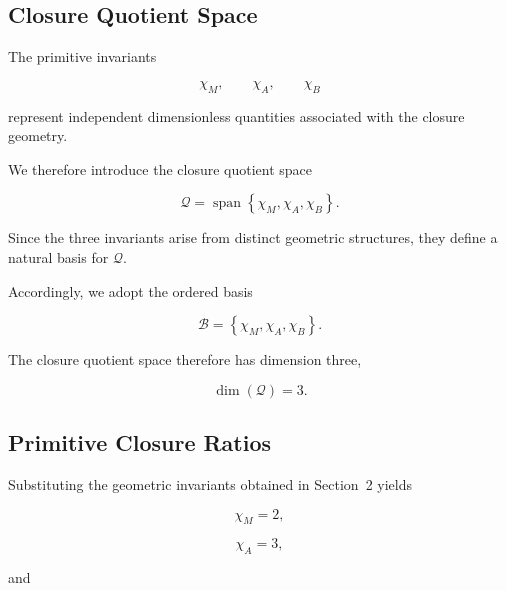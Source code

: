 \documentclass[11pt]{article}
\theoremstyle{definition}
\theoremstyle{remark}
\begin{document}
\subsection{Closure Quotient Space}
\label{subsec:closure_quotient_space}

The primitive invariants

\begin{equation}
\chi_M,
\qquad
\chi_A,
\qquad
\chi_B
\end{equation}

represent independent dimensionless quantities associated with
the closure geometry.

We therefore introduce the closure quotient space

\begin{equation}
\mathcal Q
=
\operatorname{span}
\left\{
\chi_M,
\chi_A,
\chi_B
\right\}.
\label{eq:closure_quotient_space}
\end{equation}

Since the three invariants arise from distinct geometric
structures, they define a natural basis for \(\mathcal Q\).

Accordingly, we adopt the ordered basis

\begin{equation}
\mathcal B
=
\left\{
\chi_M,
\chi_A,
\chi_B
\right\}.
\label{eq:closure_basis}
\end{equation}

The closure quotient space therefore has dimension three,

\begin{equation}
\dim(\mathcal Q) = 3.
\end{equation}


\subsection{Primitive Closure Ratios}
\label{subsec:primitive_closure_ratios}

Substituting the geometric invariants obtained in
Section~2 yields

\begin{equation}
\chi_M =
2,
\end{equation}

\begin{equation}
\chi_A = 3,
\end{equation}

and
\end{document}

